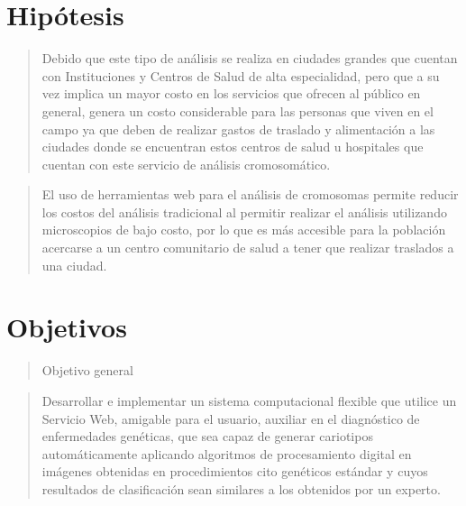 \documentclass[12pt,letterpaper,titlepage]{article}
\begin{document}



\section{Hipótesis}\label{hipotesis}


\begin{quotation}
Debido que este tipo de análisis se realiza en ciudades grandes que cuentan con Instituciones y Centros de Salud de alta especialidad, pero que a su vez implica un mayor costo en los servicios que ofrecen al público en general, genera un costo considerable para las personas que viven en el campo ya que deben de realizar gastos de traslado y alimentación a las ciudades donde se encuentran estos centros de salud u hospitales que cuentan con este servicio de análisis cromosomático.
\end{quotation}

\begin{quotation}
El uso de herramientas web para el análisis de cromosomas permite reducir los costos del análisis tradicional al permitir realizar el análisis utilizando microscopios de bajo costo, por lo que es más accesible para la población acercarse a un centro comunitario de salud a tener que realizar traslados a una ciudad.
\end{quotation}



\section{Objetivos}\label{objetivos}

\begin{quotation}
Objetivo general
\end{quotation}
\begin{quotation}
Desarrollar e implementar un sistema computacional flexible que utilice un Servicio Web, amigable para el usuario, auxiliar en el diagnóstico de enfermedades genéticas, que sea capaz de generar cariotipos automáticamente aplicando algoritmos de procesamiento digital en imágenes obtenidas en procedimientos cito genéticos estándar y cuyos resultados de clasificación sean similares a los obtenidos por un experto.
\end{quotation}
\end{document}
